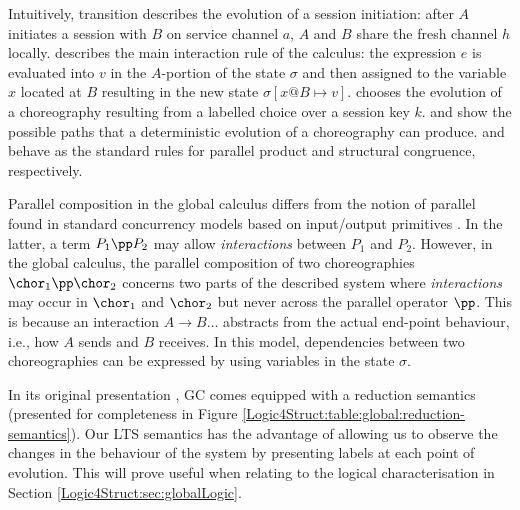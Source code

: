 Intuitively, transition  describes the evolution of a
session initiation: after $A$ initiates a session with $B$ on service
channel $a$, $A$ and $B$ share the fresh channel $h$ locally.
 describes the main interaction rule of the calculus: the
expression $e$ is evaluated into $v$ in the $A$-portion of the state
$\sigma$ and then assigned to the variable $x$ located at $B$
resulting in the new state $\sigma [x@B \mapsto v]$. 
chooses the evolution of a choreography resulting from a labelled
choice over a session key $k$.  and  show the
possible paths that a deterministic evolution of a choreography can
produce.  and  behave as the standard rules
for parallel product and structural congruence, respectively.

\begin{remark}
  Parallel composition in the global calculus differs from the notion
  of parallel found in standard concurrency models based on
  input/output primitives \cite{milner:99:cmspc}. In the latter, a
  term $P_1\pp P_2$ may allow {\em interactions} between $P_1$ and
  $P_2$. However, in the global calculus, the parallel composition of
  two choreographies $\chor_1\pp \chor_2$ concerns two parts of the
  described system where {\em interactions} may occur in $\chor_1$ and
  $\chor_2$ but never across the parallel operator $\pp$. This is
  because an interaction $A\rightarrow B\ldots$ abstracts from the
  actual end-point behaviour, i.e., how $A$ sends and $B$ receives. In
  this model, dependencies between two choreographies can be expressed
  by using variables in the state $\sigma$.
\end{remark}

In its original presentation \cite{carbone7scc}, GC comes equipped
with a reduction semantics (presented for completeness in Figure
\ref{Logic4Struct:table:global:reduction-semantics}).
Our LTS semantics has the advantage of
allowing us to observe the changes in the behaviour of the system by
presenting labels at each point of evolution. This  will
prove useful when relating to the logical characterisation in Section
\ref{Logic4Struct:sec:globalLogic}. 


